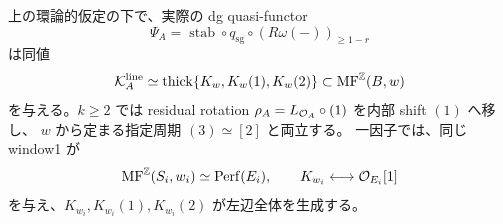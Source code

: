 \begin{lemma}
\label{mbnp:lem:window}
上の環論的仮定の下で、実際の dg quasi-functor
\begin{equation}\label{mbnp:eq:window}
 \Psi_A=\operatorname{stab}\circ q_{\mathrm{sg}}
                    \circ(R\omega(-))_{\geq1-r}
\end{equation}
は同値
\[
 \mathcal K_A^{\mathrm{line}}\simeq
  \operatorname{thick}\{K_w,K_w(1),K_w(2)\}
    \subset\operatorname{MF}^{\mathbb Z}(B,w)
\]
を与える。$k\geq2$ では residual rotation
$\rho_A=L_{\mathcal O_A}\circ(1)$ を内部 shift $(1)$ へ移し、
$w$ から定まる指定周期 $(3)\simeq[2]$ と両立する。
一因子では、同じ window1 が
\begin{equation}\label{mbnp:eq:factor-window}
 \operatorname{MF}^{\mathbb Z}(S_i,w_i)\simeq\operatorname{Perf}(E_i),\qquad
 K_{w_i}\longleftrightarrow\mathcal O_{E_i}[1]
\end{equation}
を与え、$K_{w_i},K_{w_i}(1),K_{w_i}(2)$ が左辺全体を生成する。
\end{lemma}
